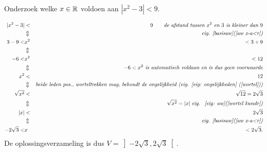 \documentclass[numbers,wordchoicegiven]{ximera}
\begin{document}
\begin{problem}	Onderzoek welke $x\in \mathbb{R}$ voldoen aan $|x^2-3|<9$.
		\begin{expandable}
		\begin{oplossing}
			\begin{eqnarray*}|x^2-3|&<&9 \qquad \textit{de afstand tussen $x^2$ en $3$ is
					kleiner dan $9$}\\&\Updownarrow &\textit{eig.
					\ref{basisaw}(\ref{aw x-a<r})}
				\\3-9<&x^2&<3+9\\&\Updownarrow
				&\\-6<&x^2&<12\\&\Updownarrow&\textit{$-6<x^2$ is automatisch
					voldaan en is dus geen
					voorwaarde}\\x^2&<&12\\&\Updownarrow&\textit{beide leden pos.,
					worteltrekken mag, behoudt de ongelijkheid (eig. \ref{eig:
						ongelijkheden}
					(\ref{wortel}))}\\\sqrt{x^2}&<&\sqrt{12}=2\sqrt{3}\\&\Updownarrow
				&\qquad \sqrt{x^2}=|x| \;\textit{eig. ~\ref{eig: aw}(\ref{wortel
						kwadr})}\\|x|&<&2\sqrt{3}
				\\&\Updownarrow &\textit{eig. \ref{basisaw}(\ref{aw x-a<r})}\\-2\sqrt{3}<&x&<2\sqrt{3}.
			\end{eqnarray*}
			De oplossingsverzameling is dus $\displaystyle
			V=\left]-2\sqrt{3},2\sqrt{3}\right[.$
		\end{oplossing}
		\end{expandable}

\end{problem}
\end{document}
